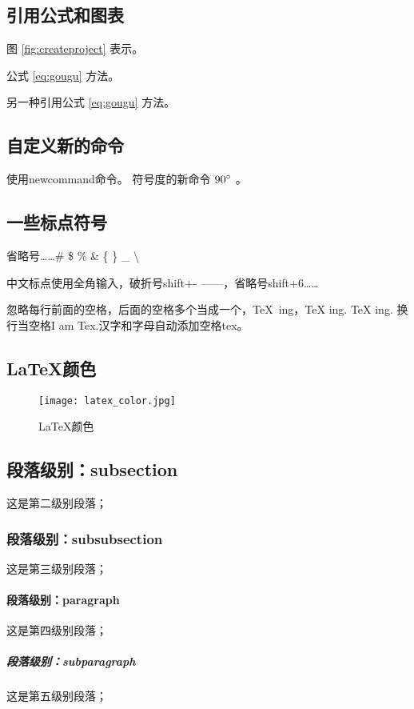 \subsection{引用公式和图表}
图 \ref{fig:createproject} 表示。

公式 \ref{eq:gougu} 方法。

另一种引用公式 \eqref{eq:gougu} 方法。 %

\subsection{自定义新的命令}
使用newcommand命令。
符号度的新命令 $90^\circ$ 。%

\subsection{一些标点符号}
省略号\ldots \dots \# \quad \$ \quad \% \quad \& \quad \{ \quad \} \quad \_ \quad \textbackslash

中文标点使用全角输入，破折号shift+- ——，省略号shift+6……

忽略每行前面的空格，后面的空格多个当成一个，\TeX\ ing，\TeX{} ing. {\TeX} ing. 换行当空格I 
am Tex.汉字和字母自动添加空格tex。

\subsection{\LaTeX 颜色}
\begin{figure}[H]
\centering
\texttt{[image: latex\_color.jpg]}
\caption{\LaTeX 颜色}
\label{fig:latex color}
\end{figure}

\subsection{段落级别：subsection}
这是第二级别段落；
\subsubsection{段落级别：subsubsection}
这是第三级别段落；
\paragraph{段落级别：paragraph}
这是第四级别段落；
\subparagraph{段落级别：subparagraph}
这是第五级别段落；


